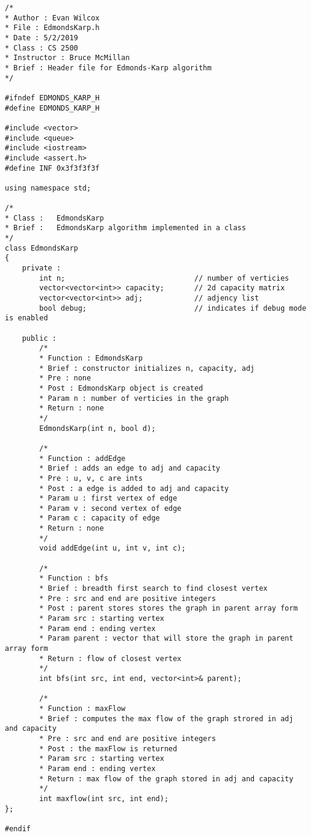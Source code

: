 \documentclass[a4paper]{article}
\begin{document}
    \begin{verbatim}
/*
* Author : Evan Wilcox
* File : EdmondsKarp.h 
* Date : 5/2/2019
* Class : CS 2500
* Instructor : Bruce McMillan
* Brief : Header file for Edmonds-Karp algorithm
*/

#ifndef EDMONDS_KARP_H
#define EDMONDS_KARP_H

#include <vector>
#include <queue>
#include <iostream>
#include <assert.h>
#define INF 0x3f3f3f3f 

using namespace std;

/*
* Class :   EdmondsKarp
* Brief :   EdmondsKarp algorithm implemented in a class
*/
class EdmondsKarp
{
    private :  
        int n;                              // number of verticies
        vector<vector<int>> capacity;       // 2d capacity matrix 
        vector<vector<int>> adj;            // adjency list
        bool debug;                         // indicates if debug mode is enabled

    public :  
        /*
        * Function : EdmondsKarp
        * Brief : constructor initializes n, capacity, adj
        * Pre : none
        * Post : EdmondsKarp object is created
        * Param n : number of verticies in the graph
        * Return : none
        */
        EdmondsKarp(int n, bool d);

        /*
        * Function : addEdge
        * Brief : adds an edge to adj and capacity
        * Pre : u, v, c are ints
        * Post : a edge is added to adj and capacity
        * Param u : first vertex of edge  
        * Param v : second vertex of edge
        * Param c : capacity of edge
        * Return : none
        */
        void addEdge(int u, int v, int c);

        /*
        * Function : bfs
        * Brief : breadth first search to find closest vertex
        * Pre : src and end are positive integers
        * Post : parent stores stores the graph in parent array form 
        * Param src : starting vertex
        * Param end : ending vertex
        * Param parent : vector that will store the graph in parent array form 
        * Return : flow of closest vertex
        */
        int bfs(int src, int end, vector<int>& parent);

        /*
        * Function : maxFlow
        * Brief : computes the max flow of the graph strored in adj and capacity
        * Pre : src and end are positive integers
        * Post : the maxFlow is returned
        * Param src : starting vertex
        * Param end : ending vertex
        * Return : max flow of the graph stored in adj and capacity
        */
        int maxflow(int src, int end);
};

#endif
    \end{verbatim}
\end{document}
